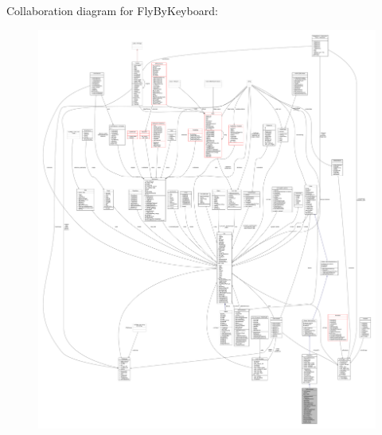 Collaboration diagram for Fly\+By\+Keyboard\+:
\nopagebreak
\begin{figure}[H]
\begin{center}
\leavevmode
\includegraphics[width=350pt]{dc/d07/classFlyByKeyboard__coll__graph}
\end{center}
\end{figure}
